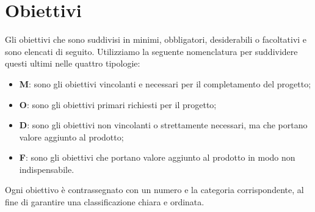 \section{Obiettivi}
Gli obiettivi che sono suddivisi in minimi, obbligatori, desiderabili o facoltativi e sono elencati di seguito.
Utilizziamo la seguente nomenclatura per suddividere questi ultimi nelle quattro tipologie:
\begin{itemize}
    \item \textbf{M}: sono gli obiettivi vincolanti e necessari per il completamento del progetto; 
    \item \textbf{O}: sono gli obiettivi primari richiesti per il progetto;
    \item \textbf{D}: sono gli obiettivi non vincolanti o strettamente necessari, ma che portano valore aggiunto al prodotto;
    \item \textbf{F}: sono gli obiettivi che portano valore aggiunto al prodotto in modo non indispensabile.
\end{itemize}
Ogni obiettivo è contrassegnato con un numero e la categoria corrispondente, al fine di garantire una classificazione chiara e ordinata.
